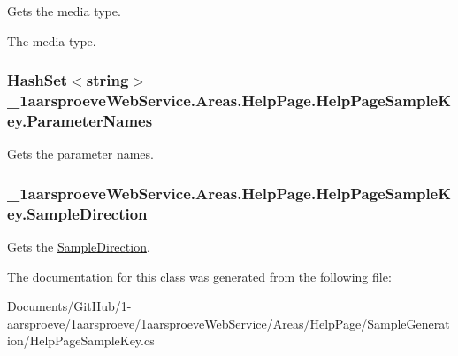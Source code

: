 Gets the media type. 

The media type. \hypertarget{class__1aarsproeve_web_service_1_1_areas_1_1_help_page_1_1_help_page_sample_key_a2e76cfdbf00172ca1a0dedc0073aeb7b}{}
\subsubsection[{Parameter\+Names}]{\setlength{\rightskip}{0pt plus 5cm}Hash\+Set$<$string$>$ \+\_\+1aarsproeve\+Web\+Service.\+Areas.\+Help\+Page.\+Help\+Page\+Sample\+Key.\+Parameter\+Names\hspace{0.3cm}{\ttfamily [get]}}\label{class__1aarsproeve_web_service_1_1_areas_1_1_help_page_1_1_help_page_sample_key_a2e76cfdbf00172ca1a0dedc0073aeb7b}


Gets the parameter names. 

\hypertarget{class__1aarsproeve_web_service_1_1_areas_1_1_help_page_1_1_help_page_sample_key_a69980321c5a86fc11bbd2d4b3bca84ef}{}
\subsubsection[{Sample\+Direction}]{ \+\_\+1aarsproeve\+Web\+Service.\+Areas.\+Help\+Page.\+Help\+Page\+Sample\+Key.\+Sample\+Direction\hspace{0.3cm}{\ttfamily [get]}}\label{class__1aarsproeve_web_service_1_1_areas_1_1_help_page_1_1_help_page_sample_key_a69980321c5a86fc11bbd2d4b3bca84ef}


Gets the \hyperlink{class__1aarsproeve_web_service_1_1_areas_1_1_help_page_1_1_help_page_sample_key_a69980321c5a86fc11bbd2d4b3bca84ef}{Sample\+Direction}. 



The documentation for this class was generated from the following file\+:\begin{DoxyCompactItemize}
\item 
Documents/\+Git\+Hub/1-\/aarsproeve/1aarsproeve/1aarsproeve\+Web\+Service/\+Areas/\+Help\+Page/\+Sample\+Generation/Help\+Page\+Sample\+Key.\+cs\end{DoxyCompactItemize}
